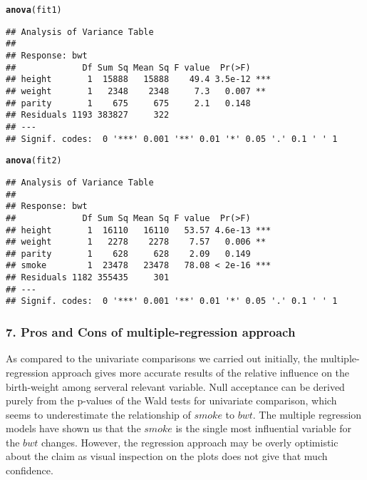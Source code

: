 \documentclass{article}\usepackage{graphicx, color}
\makeatletter
\newcommand{\hlfunctioncall}[1]{\textcolor[rgb]{0.501960784313725,0,0.329411764705882}{\textbf{#1}}}%
\newenvironment{kframe}{%
 \def\at@end@of@kframe{}%
 \ifinner\ifhmode%
  \def\at@end@of@kframe{\end{minipage}}%
  \begin{minipage}{\columnwidth}%
 \fi\fi%
 \def\FrameCommand##1{\hskip\@totalleftmargin \hskip-\fboxsep
 \colorbox{shadecolor}{##1}\hskip-\fboxsep
     \hskip-\linewidth \hskip-\@totalleftmargin \hskip\columnwidth}%
 \MakeFramed {\advance\hsize-\width
   \@totalleftmargin\z@ \linewidth\hsize
   \@setminipage}}%
 {\par\unskip\endMakeFramed%
 \at@end@of@kframe}
\newenvironment{knitrout}{}{} %
\makeatother
\begin{document}
\newpage
\begin{knitrout}
\color{fgcolor}\begin{kframe}
\begin{alltt}
\hlfunctioncall{anova}(fit1)
\end{alltt}
\begin{verbatim}
## Analysis of Variance Table
## 
## Response: bwt
##             Df Sum Sq Mean Sq F value  Pr(>F)    
## height       1  15888   15888    49.4 3.5e-12 ***
## weight       1   2348    2348     7.3   0.007 ** 
## parity       1    675     675     2.1   0.148    
## Residuals 1193 383827     322                    
## ---
## Signif. codes:  0 '***' 0.001 '**' 0.01 '*' 0.05 '.' 0.1 ' ' 1
\end{verbatim}
\begin{alltt}
\hlfunctioncall{anova}(fit2)
\end{alltt}
\begin{verbatim}
## Analysis of Variance Table
## 
## Response: bwt
##             Df Sum Sq Mean Sq F value  Pr(>F)    
## height       1  16110   16110   53.57 4.6e-13 ***
## weight       1   2278    2278    7.57   0.006 ** 
## parity       1    628     628    2.09   0.149    
## smoke        1  23478   23478   78.08 < 2e-16 ***
## Residuals 1182 355435     301                    
## ---
## Signif. codes:  0 '***' 0.001 '**' 0.01 '*' 0.05 '.' 0.1 ' ' 1
\end{verbatim}
\end{kframe}
\end{knitrout}



\subsubsection*{7. Pros and Cons of multiple-regression approach}
\hspace{12 pt} As compared to the univariate comparisons we carried
out initially, the multiple-regression approach gives more accurate
results of the relative influence on the birth-weight among serveral
relevant variable. Null acceptance can be derived purely from the p-values of the Wald
tests for univariate comparison, which seems to underestimate the
relationship of $smoke$ to $bwt$. The multiple regression models have
shown us that the $smoke$ is the single most influential variable for
the $bwt$ changes. However, the regression approach may be overly
optimistic about the claim as visual inspection on the plots does not
give that much confidence.

 
\end{document}
